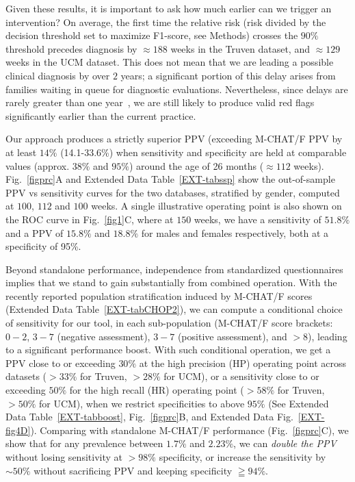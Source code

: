 \documentclass[3p,super,numbers,sort&compress,preprint,10pt]{elsarticle}
\begin{document}
Given these results, it is important to ask how much earlier can we trigger an intervention? On average,  the first time the relative risk (risk divided by the decision threshold set to maximize F1-score, see Methods) crosses the $90\%$ threshold precedes  diagnosis by  $\approx 188$ weeks in the Truven dataset, and $\approx 129$ weeks in the UCM dataset.
This does not mean that we are   leading a possible clinical diagnosis by over $2$ years; a significant portion of this delay arises from families waiting in queue for diagnostic evaluations. Nevertheless, since delays are rarely greater than   one year~\cite{gordon2016whittling},  we are still likely to produce valid red flags significantly earlier than the current practice.%

Our approach produces a strictly superior PPV (exceeding M-CHAT/F PPV by at  least $14\%$ (14.1-33.6\%) when sensitivity and specificity are held at comparable values (approx. $38\%$ and $95\%$) around the age of 26 months ($\approx 112$ weeks). Fig.~\ref{figprc}A and Extended Data Table~\ref{EXT-tabssp} show  the out-of-sample  PPV vs sensitivity curves   for the two databases, stratified by gender, computed at $100$, $112$ and $100$ weeks. A single illustrative operating point is also shown on the ROC curve in Fig.~\ref{fig1}C, where at $150$ weeks, we have a sensitivity of $51.8\%$ and a PPV of $15.8\%$ and $18.8\%$ for males and females respectively, both at a specificity of 95\%. 

Beyond standalone performance, independence from standardized questionnaires implies that we stand to gain substantially  from combined operation. With the recently reported population stratification induced by M-CHAT/F scores~\cite{pmid31562252} (Extended Data Table~\ref{EXT-tabCHOP2}), we can compute a conditional choice of sensitivity  for our tool, in each sub-population (M-CHAT/F score brackets: $0-2$, $3-7$ (negative assessment), $3-7$ (positive assessment), and $>8$), leading to a  significant performance boost. With such conditional operation, we get a PPV close to or exceeding $30\%$ at the high precision (HP) operating point across datasets ($>33\%$ for Truven, $>28\%$ for UCM), or a sensitivity close to or exceeding $50\%$ for the high recall (HR) operating point ($>58\%$ for  Truven, $>50\%$ for UCM), when we restrict specificities to above $95\%$ (See Extended Data Table~\ref{EXT-tabboost}, Fig.~\ref{figprc}B, and Extended Data Fig.~\ref{EXT-fig4D}). Comparing   with standalone M-CHAT/F performance (Fig.~\ref{figprc}C), we show that for any prevalence between 
$1.7\%$ and $2.23\%$, we can   \textit{double the PPV} without losing sensitivity at $>98\%$ specificity, or increase the sensitivity by $\sim 50\%$ without sacrificing PPV and  keeping specificity $\geqq 94\%$.%
\end{document}
